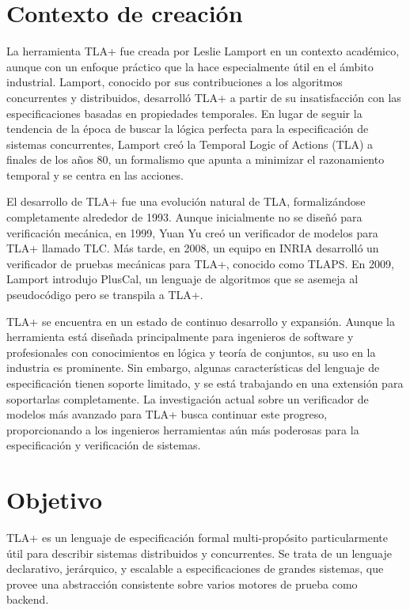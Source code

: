 \documentclass[runningheads]{llncs}
\begin{document}
\section{Contexto de creación}
La herramienta TLA+ fue creada por Leslie Lamport en un contexto académico, aunque con un enfoque práctico que la hace especialmente útil en el ámbito industrial. Lamport, conocido por sus contribuciones a los algoritmos concurrentes y distribuidos, desarrolló TLA+ a partir de su insatisfacción con las especificaciones basadas en propiedades temporales. En lugar de seguir la tendencia de la época de buscar la lógica perfecta para la especificación de sistemas concurrentes, Lamport creó la Temporal Logic of Actions (TLA) a finales de los años 80, un formalismo que apunta a minimizar el razonamiento temporal y se centra en las acciones.

El desarrollo de TLA+ fue una evolución natural de TLA, formalizándose completamente alrededor de 1993. Aunque inicialmente no se diseñó para verificación mecánica, en 1999, Yuan Yu creó un verificador de modelos para TLA+ llamado TLC. Más tarde, en 2008, un equipo en INRIA desarrolló un verificador de pruebas mecánicas para TLA+, conocido como TLAPS. En 2009, Lamport introdujo PlusCal, un lenguaje de algoritmos que se asemeja al pseudocódigo pero se transpila a TLA+.

TLA+ se encuentra en un estado de continuo desarrollo y expansión. Aunque la herramienta está diseñada principalmente para ingenieros de software y profesionales con conocimientos en lógica y teoría de conjuntos, su uso en la industria es prominente. Sin embargo, algunas características del lenguaje de especificación tienen soporte limitado, y se está trabajando en una extensión para soportarlas completamente. La investigación actual sobre un verificador de modelos más avanzado para TLA+ busca continuar este progreso, proporcionando a los ingenieros herramientas aún más poderosas para la especificación y verificación de sistemas.

\section{Objetivo}
TLA+ es un lenguaje de especificación formal multi-propósito particularmente útil para describir sistemas distribuidos y concurrentes. Se trata de un lenguaje declarativo, jerárquico, y escalable a especificaciones de grandes sistemas, que provee una abstracción consistente sobre varios motores de prueba como backend. 
\end{document}
